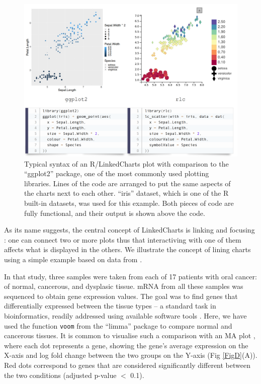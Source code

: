 \documentclass[twocolumn,10pt]{article}
\begin{document}
\begin{figure}[t]
	\includegraphics[width=\textwidth]{FigB/figB.png}
	\caption{Typical syntax of an R/LinkedCharts plot with comparison to the ``ggplot2'' \citep{wickham_2016} package, one of the most commonly used plotting libraries. Lines of the code are arranged to put the same aspects of the charts next to each other. ``iris'' dataset, which is one of the R built-in datasets, was used for this example. Both pieces of code are fully functional, and their output is shown above the code.}
	\label{FigB}
\end{figure}

As its name suggests, the central concept of LinkedCharts is linking and focusing \citep{buja_1991}: one can connect two or more plots thus that interactiving with one of them affects what is displayed in the others. We illustrate the concept  of lining charts using a simple example based on data from \citet{conway_2015}.

In that study, three samples were taken from each of 17 patients with oral cancer: of normal, cancerous, and dysplasic tissue. mRNA from all these samples was sequenced to obtain gene expression values. The goal was to find genes that differentially expressed between the tissue types -- a standard task in bioinformatics, readily addressed using available software tools \citep{ritchie_2015, love_2014}. Here, we have used the function \texttt{voom} \citep{law_2014} from the ``limma'' package to compare normal and cancerous tissues. It is common to visualise such a comparison with an MA plot \citep{dudoit_2002}, where each dot represents a gene, showing the gene's average expression on the X-axis and log fold change between the two groups on the Y-axis (Fig \ref{FigD}(A)). Red dots correspond to genes that are considered significantly different between the two conditions (adjusted p-value $<$ 0.1). 
\end{document}
